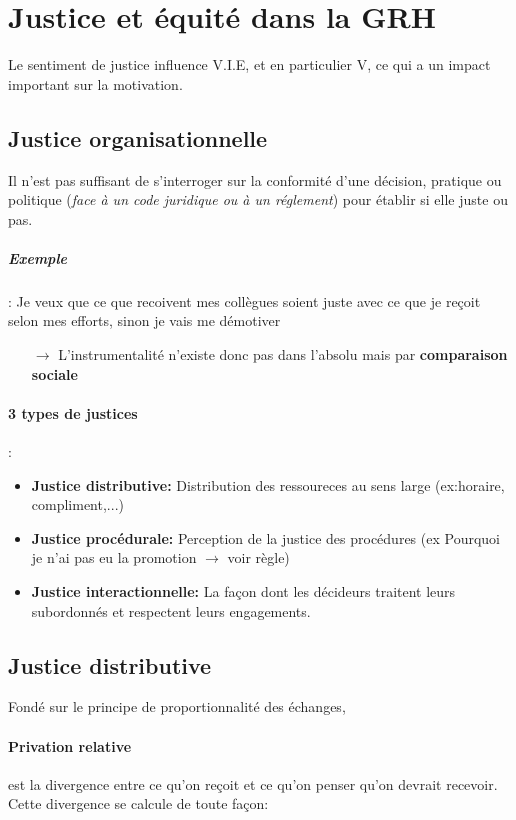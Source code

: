 \documentclass[11pt]{article} %
\begin{document}
\section{Justice et équité dans la GRH}

Le sentiment de justice influence V.I.E, et en particulier V,
ce qui a un impact important sur la motivation.

\subsection{Justice organisationnelle} 

Il n'est pas suffisant de s'interroger sur la conformité d'une
décision, pratique ou politique (\textit{face à un code juridique ou à
un réglement}) pour établir si elle juste ou pas.

\subparagraph{Exemple} : Je veux que ce que recoivent mes collègues
soient juste avec ce que je reçoit selon mes efforts, sinon je vais me
démotiver

\begin{itemize}
    \item[$\to$] L'instrumentalité n'existe donc pas dans l'absolu mais
        par \textbf{comparaison sociale}
\end{itemize}

\paragraph{3 types de justices} : 
\begin{itemize}
\item \textbf{Justice distributive:} Distribution des ressoureces au sens large
    (ex:horaire, compliment,...)
\item \textbf{Justice procédurale:} Perception de la justice des procédures (ex
    Pourquoi je n'ai pas eu la promotion $\to$ voir règle)
\item \textbf{Justice interactionnelle:} La façon dont les décideurs traitent
    leurs subordonnés et respectent leurs engagements.
\end{itemize}


\subsection{Justice distributive}

Fondé sur le principe de proportionnalité des échanges, 

\paragraph{Privation relative} est la divergence 
entre ce qu'on reçoit et ce qu'on penser qu'on devrait recevoir. Cette
divergence se calcule de toute façon:
\end{document}
